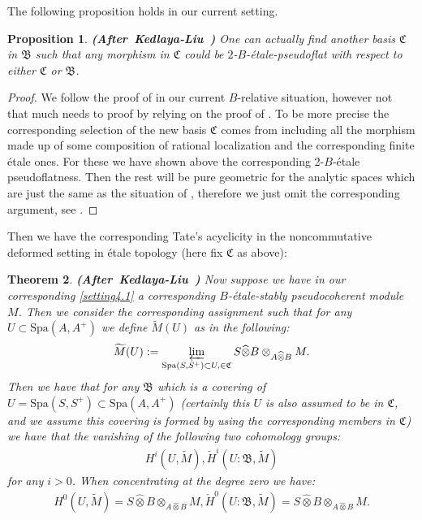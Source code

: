 \documentclass[12pt]{amsart}
\newtheorem{theorem}{Theorem}[section]
\newtheorem{proposition}[theorem]{Proposition}
\theoremstyle{definition}
\numberwithin{equation}{section}
\begin{document}
\indent The following proposition holds in our current setting. 


\begin{proposition} \mbox{\bf{(After Kedlaya-Liu \cite[Lemma 2.5.10]{KL2})}} \label{proposition4.18}
One can actually find another basis $\mathfrak{C}$ in $\mathfrak{B}$ such that any morphism in $\mathfrak{C}$ could be $2$-$B$-\'etale-pseudoflat with respect to either $\mathfrak{C}$ or $\mathfrak{B}$.	
\end{proposition}



\begin{proof}
We follow the proof of \cite[Lemma 2.5.10]{KL2} in our current $B$-relative situation, however not that much needs to proof by relying on the proof of \cite[Lemma 2.5.10]{KL2}. To be more precise the corresponding selection of the new basis $\mathfrak{C}$ comes from including all the morphism made up of some composition of rational localization and the corresponding finite \'etale ones. For these we have shown above the corresponding 2-$B$-\'etale pseudoflatness. Then the rest will be pure geometric for the analytic spaces which are just the same as the situation of \cite[Lemma 2.5.10]{KL2}, therefore we just omit the corresponding argument, see \cite[Lemma 2.5.10]{KL2}.	
\end{proof}


\indent Then we have the corresponding Tate's acyclicity in the noncommutative deformed setting in \'etale topology (here fix $\mathfrak{C}$ as above):

\begin{theorem}\mbox{\bf{(After Kedlaya-Liu \cite[Theorem 2.5.11]{KL2})}} \label{theorem4.19} Now suppose we have in our corresponding \cref{setting4.1} a corresponding $B$-\'etale-stably pseudocoherent module $M$. Then we consider the corresponding assignment such that for any $U\subset \mathrm{Spa}(A,A^+)$ we define $\widetilde{M}(U)$ as in the following:
\begin{align}
\widetilde{M}(U):=\varprojlim_{\mathrm{Spa}(S,S^+)\subset U,\in \mathfrak{C}} S\widehat{\otimes}B\otimes_{A\widehat{\otimes}B}M.	
\end{align}
Then we have that for any $\mathfrak{B}$ which is a covering of $U=\mathrm{Spa}(S,S^+)\subset \mathrm{Spa}(A,A^+)$ (certainly this $U$ is also assumed to be in $\mathfrak{C}$, and we assume this covering is formed by using the corresponding members in $\mathfrak{C}$) we have that the vanishing of the following two cohomology groups:
\begin{align}
H^i(U,\widetilde{M}), \check{H}^i(U:\mathfrak{B},\widetilde{M})
\end{align}
for any $i>0$. When concentrating at the degree zero we have:
\begin{align}
H^0(U,\widetilde{M})=S\widehat{\otimes}B\otimes_{A\widehat{\otimes}B}M, \check{H}^0(U:\mathfrak{B},\widetilde{M})=S\widehat{\otimes}B\otimes_{A\widehat{\otimes}B}M.
\end{align}
	
\end{theorem}
 	
\end{document}

